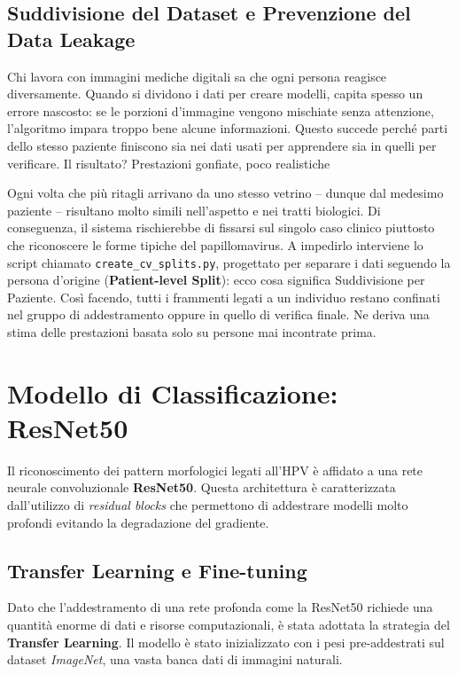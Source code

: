 \subsection{Suddivisione del Dataset e Prevenzione del Data Leakage}

Chi lavora con immagini mediche digitali sa che ogni persona reagisce diversamente. Quando si dividono i dati per creare modelli, capita spesso un errore nascosto: se le porzioni d’immagine vengono mischiate senza attenzione, l'algoritmo impara troppo bene alcune informazioni. Questo succede perché parti dello stesso paziente finiscono sia nei dati usati per apprendere sia in quelli per verificare. Il risultato? Prestazioni gonfiate, poco realistiche



Ogni volta che più ritagli arrivano da uno stesso vetrino – dunque dal medesimo paziente – risultano molto simili nell’aspetto e nei tratti biologici. Di conseguenza, il sistema rischierebbe di fissarsi sul singolo caso clinico piuttosto che riconoscere le forme tipiche del papillomavirus. A impedirlo interviene lo script chiamato \texttt{create\_cv\_splits.py}, progettato per separare i dati seguendo la persona d’origine (\textbf{Patient-level Split}): ecco cosa significa Suddivisione per Paziente. Così facendo, tutti i frammenti legati a un individuo restano confinati nel gruppo di addestramento oppure in quello di verifica finale. Ne deriva una stima delle prestazioni basata solo su persone mai incontrate prima.


\section{Modello di Classificazione: ResNet50}

Il riconoscimento dei pattern morfologici legati all'HPV è affidato a una rete neurale convoluzionale \textbf{ResNet50}. Questa architettura è caratterizzata dall'utilizzo di \textit{residual blocks} che permettono di addestrare modelli molto profondi evitando la degradazione del gradiente.


\subsection{Transfer Learning e Fine-tuning}

Dato che l'addestramento di una rete profonda come la ResNet50 richiede una quantità enorme di dati e risorse computazionali, è stata adottata la strategia del \textbf{Transfer Learning}. Il modello è stato inizializzato con i pesi pre-addestrati sul dataset \textit{ImageNet}, una vasta banca dati di immagini naturali. 


